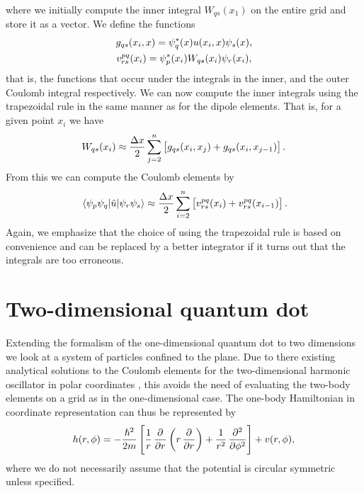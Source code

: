         where we initially compute the inner integral $W_{qs}(x_1)$ on the
        entire grid and store it as a vector.
        We define the functions
        \begin{gather}
            g_{qs}(x_i, x) = \psi^{*}_{q}(x) u(x_i, x) \psi_s(x),
            \\
            v^{pq}_{rs}(x_i)
            = \psi^{*}_{p}(x_i) W_{qs}(x_i) \psi_{r}(x_i),
        \end{gather}
        that is, the functions that occur under the integrals in the inner, and
        the outer Coulomb integral respectively.
        We can now compute the inner integrals using the trapezoidal rule in the
        same manner as for the dipole elements.
        That is, for a given point $x_i$ we have
        \begin{align}
            W_{qs}(x_i)
            \approx \frac{\Delta x}{2}
            \sum_{j = 2}^{n}
            \left[ 
                g_{qs}(x_i, x_j) + g_{qs}(x_i, x_{j - 1})
             \right].
        \end{align}
        From this we can compute the Coulomb elements by
        \begin{align}
            \mel*{\psi_{p}\psi_{q}}{\hat{u}}{\psi_{r}\psi_{s}}
            \approx
            \frac{\Delta x}{2}
            \sum_{i = 2}^{n}
            \left[ 
                v^{pq}_{rs}(x_i) + v^{pq}_{rs}(x_{i - 1})
             \right].
        \end{align}
        Again, we emphasize that the choice of using the trapezoidal rule is
        based on convenience and can be replaced by a better integrator if it
        turns out that the integrals are too erroneous.


\section{Two-dimensional quantum dot}
    Extending the formalism of the one-dimensional quantum dot to two dimensions
    we look at a system of particles confined to the plane.
    Due to there existing analytical solutions to the Coulomb elements for the
    two-dimensional harmonic oscillator in polar coordinates
    \cite{anisimovas1998energy}, this avoids the need of evaluating the two-body
    elements on a grid as in the one-dimensional case.
    The one-body Hamiltonian in coordinate representation can thus be
    represented by
    \begin{align}
        \oneten(r, \phi)
        = -\frac{\hslash^2}{2m}\brak{
            \frac{1}{r}\dpd{}{r}\para{
                r\dpd{}{r}
            }
            + \frac{1}{r^2}\dpd[2]{}{\phi}
        }
        + v(r, \phi),
    \end{align}
    where we do not necessarily assume that the potential is circular symmetric
    unless specified.

